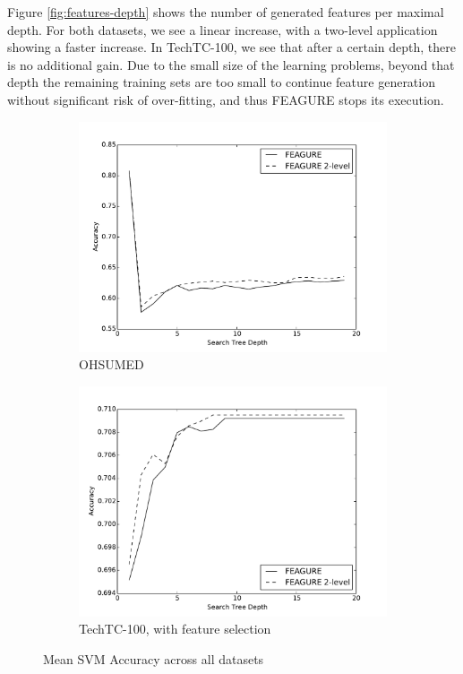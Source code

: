 \documentclass[twoside,11pt]{article}
\theoremstyle{definition}
\begin{document}
Figure \ref{fig:features-depth} shows the number of generated features per maximal depth.  For both datasets, we see a linear increase, with a two-level application showing a faster increase. In TechTC-100, we see that after a certain depth, there is no additional gain. Due to the small size of the learning problems, beyond that depth the remaining training sets are too small to continue feature generation without significant risk of over-fitting, and thus FEAGURE stops its execution.

\begin{figure}
	\centering
	\begin{subfigure}{.55\textwidth}
		\centering
		\includegraphics[width=1.1\linewidth]{new_depth_ohsumed.pdf}
		\caption{OHSUMED}
		\label{fig:svm-ohsumed}
	\end{subfigure}%
	\begin{subfigure}{.55\textwidth}
		\centering
		\includegraphics[width=1.1\linewidth]{new_depth_005_techtc.pdf}
		\caption{TechTC-100, with feature selection}
		\label{fig:svm-techtc}
	\end{subfigure}
	\caption{Mean SVM Accuracy across all datasets}
	\label{fig:svm-acc}
\end{figure}
\end{document}
